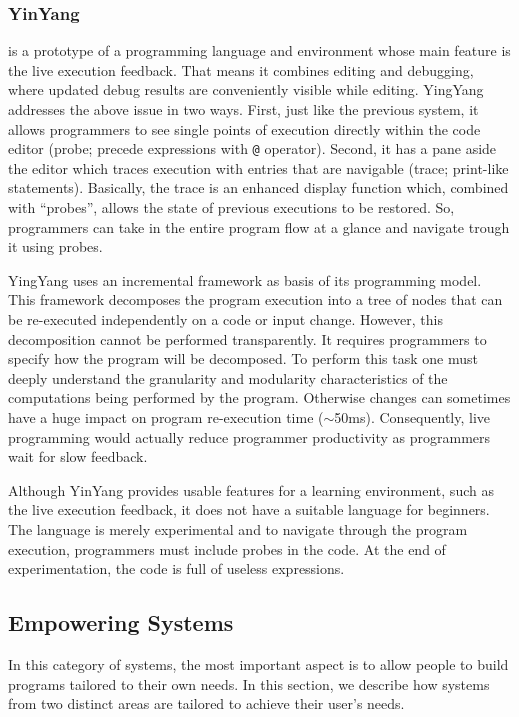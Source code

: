 \subsubsection{YinYang~\cite{mcdirmid2013usable}} is a prototype of a programming language and environment whose main feature is the live execution feedback. That means it combines editing and debugging, where updated debug results are conveniently visible while editing. YingYang addresses the above issue in two ways. First, just like the previous system, it allows programmers to see single points of execution directly within the code editor (probe; precede expressions with \texttt{@} operator). Second, it has a pane aside the editor which traces execution with entries that are navigable (trace; print-like statements). Basically, the trace is an enhanced display function which, combined with ``probes'', allows the state of previous executions to be restored. So, programmers can take in the entire program flow at a glance and navigate trough it using probes.

YingYang uses an incremental framework as basis of its programming model. This framework decomposes the program execution into a tree of nodes that can be re-executed independently on a code or input change. However, this decomposition cannot be performed transparently. It requires programmers to specify how the program will be decomposed. To perform this task one must deeply understand the granularity and modularity characteristics of the computations being performed by the program. Otherwise changes can sometimes have a huge impact on program re-execution time ($\sim$50ms). Consequently, live programming would actually reduce programmer productivity as programmers wait for slow feedback.

Although YinYang provides usable features for a learning environment, such as the live execution feedback, it does not have a suitable language for beginners. The language is merely experimental and to navigate through the program execution, programmers must include probes in the code. At the end of experimentation, the code is full of useless expressions.

\subsection{Empowering Systems}
\label{sec:es}

In this category of systems, the most important aspect is to allow people to build programs tailored to their own needs. In this section, we describe how systems from two distinct areas are tailored to achieve their user's needs. 

